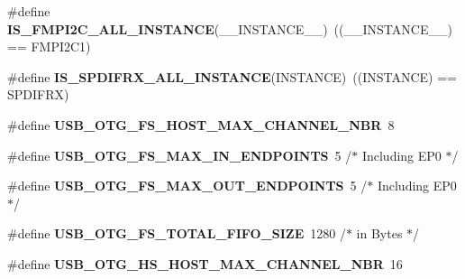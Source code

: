 \begin{DoxyCompactItemize}
\item 
\#define {\bfseries I\+S\+\_\+\+F\+M\+P\+I2\+C\+\_\+\+A\+L\+L\+\_\+\+I\+N\+S\+T\+A\+N\+CE}(\+\_\+\+\_\+\+I\+N\+S\+T\+A\+N\+C\+E\+\_\+\+\_\+)~((\+\_\+\+\_\+\+I\+N\+S\+T\+A\+N\+C\+E\+\_\+\+\_\+) == F\+M\+P\+I2\+C1)\hypertarget{group___exported__macros_ga0e0b999a82562c4a2e04e51ebd1fa99e}{}\label{group___exported__macros_ga0e0b999a82562c4a2e04e51ebd1fa99e}

\item 
\#define {\bfseries I\+S\+\_\+\+S\+P\+D\+I\+F\+R\+X\+\_\+\+A\+L\+L\+\_\+\+I\+N\+S\+T\+A\+N\+CE}(I\+N\+S\+T\+A\+N\+CE)~((I\+N\+S\+T\+A\+N\+CE) == S\+P\+D\+I\+F\+RX)\hypertarget{group___exported__macros_gade241d237a03a97ae57fccecd093ff30}{}\label{group___exported__macros_gade241d237a03a97ae57fccecd093ff30}

\item 
\#define {\bfseries U\+S\+B\+\_\+\+O\+T\+G\+\_\+\+F\+S\+\_\+\+H\+O\+S\+T\+\_\+\+M\+A\+X\+\_\+\+C\+H\+A\+N\+N\+E\+L\+\_\+\+N\+BR}~8\hypertarget{group___exported__macros_ga4c58971ce9062c1c7bc42e1c7ea4df32}{}\label{group___exported__macros_ga4c58971ce9062c1c7bc42e1c7ea4df32}

\item 
\#define {\bfseries U\+S\+B\+\_\+\+O\+T\+G\+\_\+\+F\+S\+\_\+\+M\+A\+X\+\_\+\+I\+N\+\_\+\+E\+N\+D\+P\+O\+I\+N\+TS}~5    /$\ast$ Including E\+P0 $\ast$/\hypertarget{group___exported__macros_gaccec7ca403e63ea963c363ceb7301ca6}{}\label{group___exported__macros_gaccec7ca403e63ea963c363ceb7301ca6}

\item 
\#define {\bfseries U\+S\+B\+\_\+\+O\+T\+G\+\_\+\+F\+S\+\_\+\+M\+A\+X\+\_\+\+O\+U\+T\+\_\+\+E\+N\+D\+P\+O\+I\+N\+TS}~5    /$\ast$ Including E\+P0 $\ast$/\hypertarget{group___exported__macros_ga1d58ab8276cfdef9aa868bfdd2590aae}{}\label{group___exported__macros_ga1d58ab8276cfdef9aa868bfdd2590aae}

\item 
\#define {\bfseries U\+S\+B\+\_\+\+O\+T\+G\+\_\+\+F\+S\+\_\+\+T\+O\+T\+A\+L\+\_\+\+F\+I\+F\+O\+\_\+\+S\+I\+ZE}~1280 /$\ast$ in Bytes $\ast$/\hypertarget{group___exported__macros_ga1e726d88af0f77cb8a49ff7b666fd990}{}\label{group___exported__macros_ga1e726d88af0f77cb8a49ff7b666fd990}

\item 
\#define {\bfseries U\+S\+B\+\_\+\+O\+T\+G\+\_\+\+H\+S\+\_\+\+H\+O\+S\+T\+\_\+\+M\+A\+X\+\_\+\+C\+H\+A\+N\+N\+E\+L\+\_\+\+N\+BR}~16\hypertarget{group___exported__macros_ga974d43b38d7e7578fa7ac69c64dcc473}{}\label{group___exported__macros_ga974d43b38d7e7578fa7ac69c64dcc473}


\end{DoxyCompactItemize}
